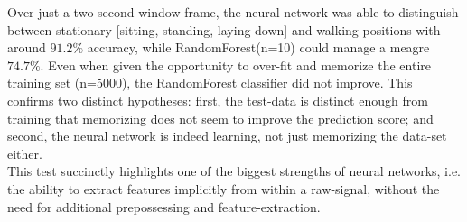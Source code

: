 Over just a two second window-frame, the neural network was able to distinguish between stationary [sitting, standing, laying down] and walking positions with around $91.2\%$ accuracy, while RandomForest(n=10) could manage a meagre $74.7\%$. Even when given the opportunity to over-fit and memorize the entire training set (n=5000), the RandomForest classifier did not improve. This confirms two distinct hypotheses: first, the test-data is distinct enough from training that memorizing does not seem to improve the prediction score; and second, the neural network is indeed learning, not just memorizing the data-set either. \\

This test succinctly highlights one of the biggest strengths of neural networks, i.e. the ability to extract features implicitly from within a raw-signal, without the need for additional prepossessing and feature-extraction. 
